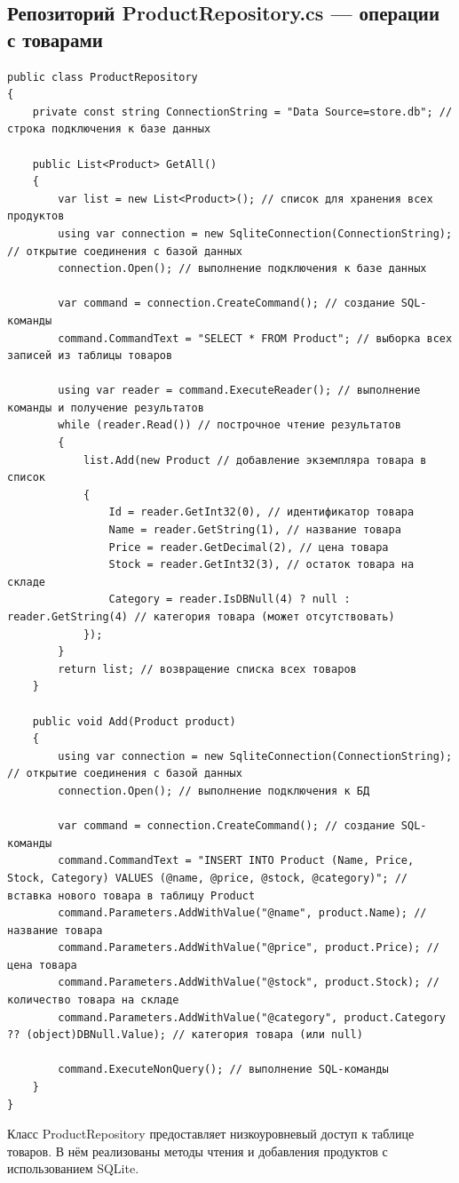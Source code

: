\documentclass[12pt]{article}
\renewcommand{\texttt}[1]{{\small\ttfamily #1}}
\newenvironment{code}{\captionsetup{type=listing}}{}
\numberwithin{listing}{section}
\numberwithin{figure}{section}
\begin{document}
\subsection{Репозиторий \texttt{ProductRepository.cs} — операции с товарами}
\begin{code}
	\begin{verbatim}
public class ProductRepository
{
    private const string ConnectionString = "Data Source=store.db"; // строка подключения к базе данных

    public List<Product> GetAll()
    {
        var list = new List<Product>(); // список для хранения всех продуктов
        using var connection = new SqliteConnection(ConnectionString); // открытие соединения с базой данных
        connection.Open(); // выполнение подключения к базе данных

        var command = connection.CreateCommand(); // создание SQL-команды
        command.CommandText = "SELECT * FROM Product"; // выборка всех записей из таблицы товаров

        using var reader = command.ExecuteReader(); // выполнение команды и получение результатов
        while (reader.Read()) // построчное чтение результатов
        {
            list.Add(new Product // добавление экземпляра товара в список
            {
                Id = reader.GetInt32(0), // идентификатор товара
                Name = reader.GetString(1), // название товара
                Price = reader.GetDecimal(2), // цена товара
                Stock = reader.GetInt32(3), // остаток товара на складе
                Category = reader.IsDBNull(4) ? null : reader.GetString(4) // категория товара (может отсутствовать)
            });
        }
        return list; // возвращение списка всех товаров
    }

    public void Add(Product product)
    {
        using var connection = new SqliteConnection(ConnectionString); // открытие соединения с базой данных
        connection.Open(); // выполнение подключения к БД

        var command = connection.CreateCommand(); // создание SQL-команды
        command.CommandText = "INSERT INTO Product (Name, Price, Stock, Category) VALUES (@name, @price, @stock, @category)"; // вставка нового товара в таблицу Product
        command.Parameters.AddWithValue("@name", product.Name); // название товара
        command.Parameters.AddWithValue("@price", product.Price); // цена товара
        command.Parameters.AddWithValue("@stock", product.Stock); // количество товара на складе
        command.Parameters.AddWithValue("@category", product.Category ?? (object)DBNull.Value); // категория товара (или null)

        command.ExecuteNonQuery(); // выполнение SQL-команды
    }
}
    \end{verbatim}
	\label{lst:ProductRepository}
\end{code}
Класс \texttt{ProductRepository} предоставляет низкоуровневый доступ к таблице товаров. В нём реализованы методы чтения и добавления продуктов с использованием SQLite.
\end{document}

